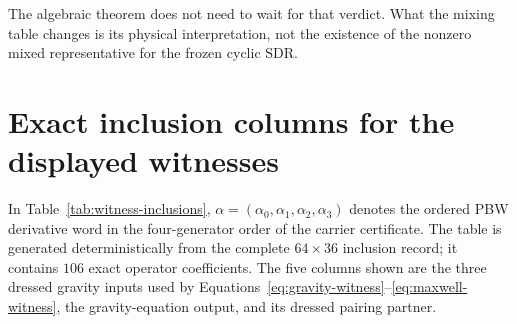 \documentclass[11pt]{article}
\theoremstyle{definition}
\theoremstyle{remark}
\begin{document}
The algebraic theorem does not need to wait for that verdict.  What the
mixing table changes is its physical interpretation, not the existence of the
nonzero mixed representative for the frozen cyclic SDR.

\appendix
\section{Exact inclusion columns for the displayed witnesses}
\label{app:witness-inclusions}

In Table~\ref{tab:witness-inclusions},
$\alpha=(\alpha_0,\alpha_1,\alpha_2,\alpha_3)$ denotes the ordered PBW
derivative word in the four-generator order of the carrier certificate.  The
table is generated deterministically from the complete $64\times36$
inclusion record; it contains $106$ exact operator coefficients.  The five
columns shown are the three dressed gravity inputs used by
Equations~\eqref{eq:gravity-witness}--\eqref{eq:maxwell-witness}, the
gravity-equation output, and its dressed pairing partner.


\end{document}
